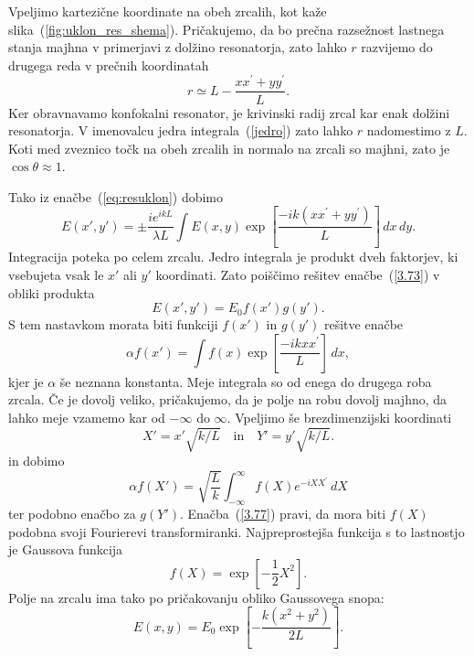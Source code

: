 \noindent
Vpeljimo kartezične koordinate na obeh zrcalih, kot kaže slika~(\ref{fig:uklon_res_shema}).
Pričakujemo, da bo prečna razsežnost lastnega stanja majhna v primerjavi
z dolžino resonatorja, zato lahko $r$ razvijemo do drugega reda v
prečnih koordinatah
\begin{equation}
r\simeq L-\frac{xx^{\prime}+yy^{\prime}}{L}.
\label{3.72}
\end{equation}
Ker obravnavamo konfokalni resonator, je krivinski radij zrcal kar enak dolžini resonatorja.
V imenovalcu jedra integrala~(\ref{jedro}) zato lahko $r$ nadomestimo
z $L$. Koti med zveznico točk na obeh zrcalih in normalo na zrcali
so majhni, zato je  $\cos\theta \approx 1$. 

\noindent
Tako iz enačbe~(\ref{eq:resuklon})
dobimo 
\begin{equation}
E(x',y')=\pm\frac{ie^{ikL}}{\lambda L}\int E(x,y)\exp
\left[\frac{-ik(xx^{\prime}+yy^{\prime})}{L}\right]\, dx\, dy.
\label{3.73}
\end{equation}
Integracija poteka po celem zrcalu. Jedro integrala je produkt dveh
faktorjev, ki vsebujeta vsak le $x'$ ali $y'$ koordinati. Zato poiščimo
rešitev enačbe~(\ref{3.73}) v obliki produkta 
\begin{equation}
E(x',y')=E_{0}f(x')g(y').
\label{3.74}
\end{equation}
S tem nastavkom morata biti funkciji $f(x')$ in $g(y')$ rešitve enačbe
\begin{equation}
\alpha f(x')=\int f(x)\exp\left[\frac{-ikxx^{\prime}}{L}\right]\, dx,
\label{3.75}
\end{equation}
kjer je $\alpha$ še neznana konstanta. Meje integrala so od enega do 
drugega roba zrcala. Če je dovolj veliko,
pričakujemo, da je polje na robu dovolj majhno, da lahko meje vzamemo
kar od $-\infty$ do $\infty$. Vpeljimo še brezdimenzijski koordinati
\begin{equation}
X'=x'\sqrt{k/L} \quad \mathrm{in} \quad Y'=y'\sqrt{k/L}.
\label{3.76}
\end{equation}
in dobimo
\begin{equation}
\alpha f(X')=\sqrt{\frac{L}{k}}\int_{-\infty}^{\infty}f(X)e^{-iXX^{\prime}}\, dX
\label{3.77}
\end{equation}
ter podobno enačbo za $g(Y')$. Enačba~(\ref{3.77}) pravi, da mora
biti $f(X)$ podobna svoji Fourierevi transformiranki. Najpreprostejša
funkcija s to lastnostjo je Gaussova funkcija 
\begin{equation}
f(X)=\exp[-\frac{1}{2}X^{2}].
\label{3.78}
\end{equation}
Polje na zrcalu ima tako po pričakovanju obliko Gaussovega snopa:
\begin{equation}
E(x,y)=E_{0}\exp\left[-\frac{k(x^{2}+y^{2})}{2L}\right].
\label{3.79}
\end{equation}

